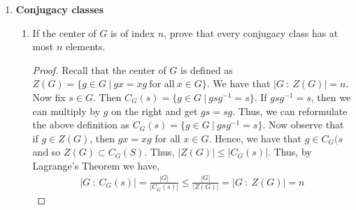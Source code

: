\documentclass[11pt, reqno]{amsart}
\theoremstyle{plain}
\theoremstyle{definition}
\theoremstyle{example}
\begin{document}
\begin{enumerate}[1.]
\begin{enumerate}[(a)]
\begin{proof}
Let $G$ be a group such that $G$ is non-abelian and $|G| = 6$. Since $|G| < \infty$, we have that $G$ is a finite group. In addition, note $2 \divides 6$ and $2$ is prime. Hence, we can apply Cauchy's Theorem which states that $G$ has an element of order $2$. Let us call this element $x \in G$. Then,
\begin{align*}
H = \langle x \rangle = \{e, x\}
\end{align*}

Note that $e, x \in H, G$, so $H \subset G$ and $H \neq \emptyset$. In addition, 
\begin{align*}
xe^{-1} &= xe\\
&= x \in H
\end{align*}

and,
\begin{align*}
ex^{-1} &= ex\\
&= x \in H
\end{align*}

Hence, for every $x, y \in H$, we have that $xy^{-1} \in H$. Thus, $H$ satisfies the subgroup criterion and so $H \le G$. Now fix $y \in G$ such that $y \neq x, e$. We know such an element exists since $|G| = 6$. Furthermore, since $G$ is non-abelian, we can fix $y$ such that $xy \neq yx$. If we could not, then it would mean that $x$ commutes with all elements of $G$. Consider $yxy^{-1}$ and suppose $yxy^{-1} \in H$. Then $yxy^{-1} = x$ or $yxy^{1} = e$. In the first case, note that $yxy^{-1} = x$ implies that $yx = xy$, a contradiction. In the second case, we have that $yxy^{1} = e$ implies that $yx = y$, which implies that $x = e$. However, we know $x \neq e$, so this also a contradiction. Hence, $yxy^{-1} \not\in H$ and thus $H$ is a non-normal subgroup of order $2$.
\end{proof}

\end{enumerate}

\item {\bf Conjugacy classes}
\begin{enumerate}
\item If the center of $G$ is of index $n$, prove that every conjugacy class has at most $n$ elements. 

\begin{proof}
Recall that the center of $G$ is defined as $Z(G) = \{g \in G \ | \ gx = xg \ \text{for all} \ x \in G\}$. We have that $|G \ : \ Z(G)| = n$. Now fix $s \in G$. Then $C_G(s) = \{g \in G \ | \ gsg^{-1} = s\}$. If $gsg^{-1} = s$, then we can multiply by $g$ on the right and get $gs = sg$. Thus, we can reformulate the above definition as $C_G(s) = \{g \in G \ | \ gsg^{-1} = s\}$. Now observe that if $g \in Z(G)$, then $gx = xg$ for all $x \in G$. Hence, we have that $g \in C_G(s$ and so $Z(G) \subset C_G(S)$. Thus, $|Z(G)| \leq |C_G(s)|$. Thus, by Lagrange's Theorem we have,
\begin{align*}
|G \ : \ C_G(s)| = \frac{|G|}{|C_G(s)|} \leq \frac{|G|}{|Z(G)|} = |G \ : \ Z(G)| = n
\end{align*}


\end{proof}
\end{enumerate}
\end{enumerate}
\end{document}
